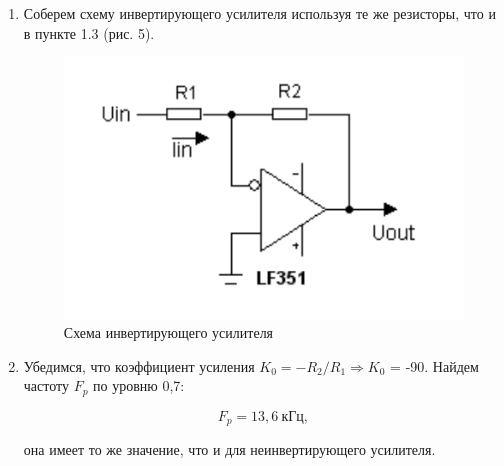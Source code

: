 \documentclass[a4paper, 12pt]{article}%
\begin{document}
\begin{enumerate}

\item Соберем схему инвертирующего усилителя используя те же резисторы, что и в пункте 1.3 (рис. 5).

\begin{figure}[h!]
\centering
\includegraphics[scale=1]{images/scheme_3.png}
\caption{Схема инвертирующего усилителя}
\label{fig:scheme_3}
\end{figure}

\item Убедимся, что коэффициент усиления $K_0 = -R_2 / R_1 \Rightarrow K_0$ = -90. Найдем частоту $F_p$ по уровню 0,7:

\[F_p = 13,6 \: \text{кГц},\]

она имеет то же значение, что и для неинвертирующего усилителя.

\end{enumerate}
\end{document}
